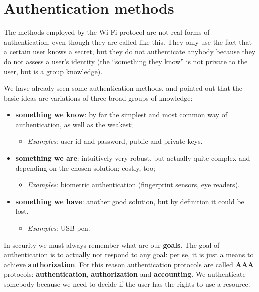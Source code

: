 \chapter{Authentication methods}
\label{ch:auth_methods}

The methods employed by the Wi-Fi protocol are not real forms of authentication, even though they are called like this. They only use the fact that a certain user knows a secret, but they do not authenticate anybody because they do not assess a user’s identity (the “something they know” is not private to the user, but is a group knowledge).
 
We have already seen some authentication methods, and pointed out that the basic ideas are variations of three broad groups of knowledge:

\begin{itemize}
\item \textbf{something we know}: by far the simplest and most common way of authentication, as well as the weakest;
\begin{itemize}
		\item \emph{Examples}: user id and password, public and private keys.
\end{itemize}

\item \textbf{something we are}: intuitively very robust, but actually quite complex and depending on the chosen solution; costly, too;
\begin{itemize}
	\item \emph{Examples}: biometric authentication (fingerprint sensors, eye readers).
\end{itemize}

\item \textbf{something we have}: another good solution, but by definition it could be lost.
\begin{itemize}
		\item \emph{Examples}: USB pen.
\end{itemize}

\end{itemize}
 
In security we must always remember what are our \textbf{goals}. The goal of authentication is to actually not respond to any goal: per se, it is just a means to achieve \textbf{authorization}. For this reason authentication protocols are called \textbf{AAA} protocols: \textbf{authentication}, \textbf{authorization} and \textbf{accounting}. We authenticate somebody because we need to decide if the user has the rights to use a resource.
 
